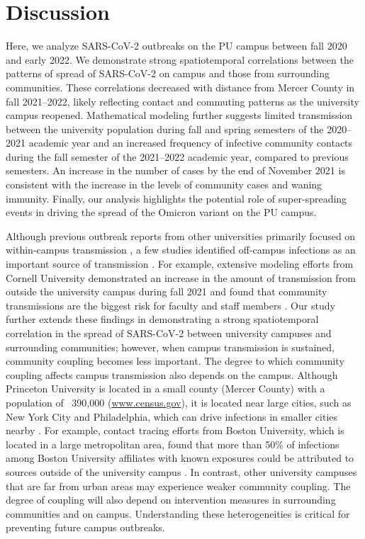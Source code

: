 \documentclass[12pt]{article}
\begin{document}
\section*{Discussion}

Here, we analyze SARS-CoV-2 outbreaks on the PU campus between fall 2020 and early 2022.
We demonstrate strong spatiotemporal correlations between the patterns of spread of SARS-CoV-2 on campus and those from surrounding communities.
These correlations decreased with distance from Mercer County in fall 2021--2022, likely reflecting contact and commuting patterns as the university campus reopened.
Mathematical modeling further suggests limited transmission between the university population during fall and spring semesters of the 2020--2021 academic year and an increased frequency of infective community contacts during the fall semester of the 2021--2022 academic year, compared to previous semesters.
An increase in the number of cases by the end of November 2021 is consistent with the increase in the levels of community cases and waning immunity.
Finally, our analysis highlights the potential role of super-spreading events in driving the spread of the Omicron variant on the PU campus.

Although previous outbreak reports from other universities primarily focused on within-campus transmission \citep{wilson2020multiple,currie2021interventions}, a few studies identified off-campus infections as an important source of transmission \citep{fox2021response,hamer2021assessment}.
For example, extensive modeling efforts from Cornell University demonstrated an increase in the amount of transmission from outside the university campus during fall 2021 and found that community transmissions are the biggest risk for faculty and staff members \citep{frazier2022modeling}.
Our study further extends these findings in demonstrating a strong spatiotemporal correlation in the spread of SARS-CoV-2 between university campuses and surrounding communities;
however, when campus transmission is sustained, community coupling becomes less important.
The degree to which community coupling affects campus transmission also depends on the campus. 
Although Princeton University is located in a small county (Mercer County) with a population of ~390,000 (\url{www.census.gov}), it is located near large cities, such as New York City and Philadelphia, which can drive infections in smaller cities nearby \citep{grenfell1997meta}.
For example, contact tracing efforts from Boston University, which is located in a large metropolitan area, found that more than 50\% of infections among Boston University affiliates with known exposures could be attributed to sources outside of the university campus \citep{hamer2021assessment}.
In contrast, other university campuses that are far from urban areas may experience weaker community coupling.
The degree of coupling will also depend on intervention measures in surrounding communities and on campus.
Understanding these heterogeneities is critical for preventing future campus outbreaks.
\end{document}
